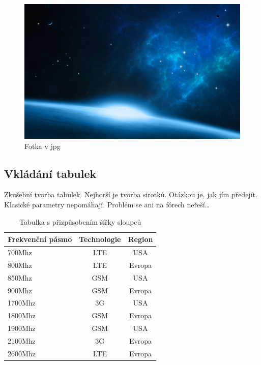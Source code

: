 \documentclass[12pt,a4paper,oneside]{article}
\numberwithin{equation}{section} %
\numberwithin{figure}{section} %
\numberwithin{table}{section} %
\begin{document}
\vspace*{10mm}
\begin{figure}[h] %
\begin{center}
\includegraphics[width=15cm]{58.jpg} %
\caption{Fotka v jpg} %
\end{center}
\end{figure}


\subsection{Vkládání tabulek}
Zkušební tvorba tabulek. Nejhorší je tvorba sirotků. Otázkou je, jak jím předejít. Klasické parametry nepomáhají. Problém se ani na fórech neřeší\ldots
\begin{table}[h] %
\caption{Tabulka s přizpůsobením šířky sloupců}
\begin{center} %
\begin{tabular}{|l|c|c|} %
\hline %
\textbf{Frekvenční pásmo} & \textbf{Technologie} & \textbf{Region} \\ %
\hline %
700Mhz & LTE & USA \\ %
\hline %
800Mhz & LTE & Evropa \\ %
\hline %
850Mhz & GSM & USA \\ %
\hline 
900Mhz & GSM & Evropa \\ 
\hline
1700Mhz & 3G & USA \\ 
\hline
1800Mhz & GSM & Evropa \\ 
\hline
1900Mhz & GSM & USA \\ 
\hline 
2100Mhz & 3G & Evropa \\ 
\hline
2600Mhz & LTE & Evropa \\ 
\hline
\end{tabular}
\end{center}
\end{table} 
\end{document}
